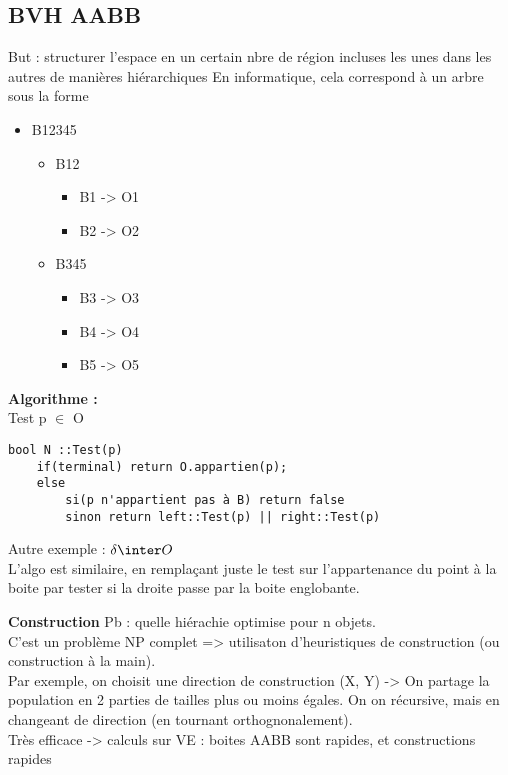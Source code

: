 \documentclass[11pt]{article}
\begin{document}
{\subsection{BVH AABB}
But : structurer l'espace en un certain nbre de région incluses les unes dans les autres de manières hiérarchiques
En informatique, cela correspond à un arbre sous la forme
\begin{itemize}
	\item  B12345
		\begin{itemize}
			\item B12
				\begin{itemize}
					\item B1 -> O1
					\item B2 -> O2
				\end{itemize}
			\item B345
				\begin{itemize}
					\item B3 -> O3
					\item B4 -> O4
					\item B5 -> O5
				\end{itemize}
		\end{itemize}
\end{itemize}

\vskip 2cm

\textbf{Algorithme :}\\
Test p $\in$ O
\begin{verbatim}
bool N ::Test(p)
	if(terminal) return O.appartien(p);
	else
		si(p n'appartient pas à B) return false
		sinon return left::Test(p) || right::Test(p)
\end{verbatim}
Autre exemple : $\delta \inter O$\\
L'algo est similaire, en remplaçant juste le test sur l'appartenance du point à la boite par tester si la droite passe par la boite englobante.

\vskip 2cm
\textbf{Construction}
Pb : quelle hiérachie optimise pour n objets.\\
C'est un problème NP complet => utilisaton d'heuristiques de construction (ou construction à la main).\\
Par exemple, on choisit une direction de construction (X, Y) -> On partage la population en 2 parties de tailles plus ou moins égales. On on récursive, mais en changeant de direction (en tournant orthognonalement).\\
Très efficace -> calculs sur VE : boites AABB sont rapides, et constructions rapides

}
\end{document}
